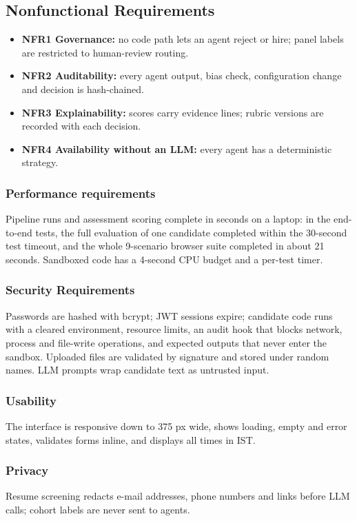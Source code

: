 \subsection{Nonfunctional Requirements}
\begin{itemize}
\item \textbf{NFR1 Governance:} no code path lets an agent reject or hire; panel labels are restricted to human-review routing.
\item \textbf{NFR2 Auditability:} every agent output, bias check, configuration change and decision is hash-chained.
\item \textbf{NFR3 Explainability:} scores carry evidence lines; rubric versions are recorded with each decision.
\item \textbf{NFR4 Availability without an LLM:} every agent has a deterministic strategy.
\end{itemize}

\subsubsection{Performance requirements}
Pipeline runs and assessment scoring complete in seconds on a laptop: in the end-to-end tests, the full evaluation of one candidate completed within the 30-second test timeout, and the whole 9-scenario browser suite completed in about 21 seconds. Sandboxed code has a 4-second CPU budget and a per-test timer.

\subsubsection{Security Requirements}
Passwords are hashed with bcrypt; JWT sessions expire; candidate code runs with a cleared environment, resource limits, an audit hook that blocks network, process and file-write operations, and expected outputs that never enter the sandbox. Uploaded files are validated by signature and stored under random names. LLM prompts wrap candidate text as untrusted input.

\subsubsection{Usability}
The interface is responsive down to 375 px wide, shows loading, empty and error states, validates forms inline, and displays all times in IST.

\subsubsection{Privacy}
Resume screening redacts e-mail addresses, phone numbers and links before LLM calls; cohort labels are never sent to agents.

